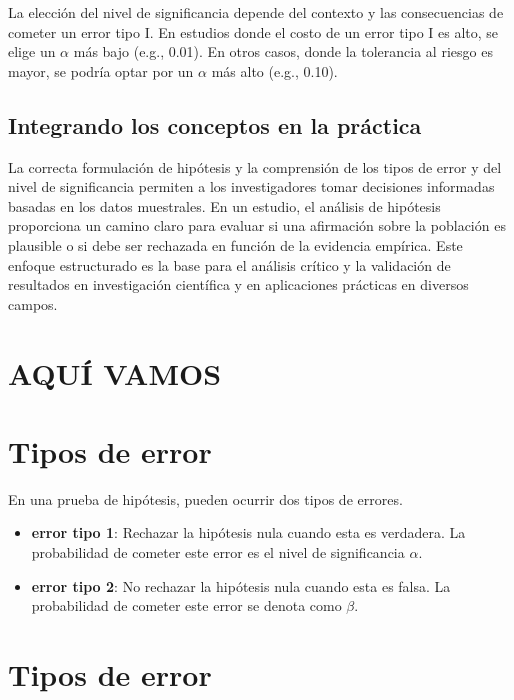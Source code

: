 \documentclass[
  letterpaper,
  DIV=11,
  numbers=noendperiod]{scrreprt}
\providecommand{\tightlist}{%
  \setlength{\itemsep}{0pt}\setlength{\parskip}{0pt}}\usepackage{longtable,booktabs,array}
\begin{document}
La elección del nivel de significancia depende del contexto y las
consecuencias de cometer un error tipo I. En estudios donde el costo de
un error tipo I es alto, se elige un \(\alpha\) más bajo (e.g., 0.01).
En otros casos, donde la tolerancia al riesgo es mayor, se podría optar
por un \(\alpha\) más alto (e.g., 0.10).

\subsection{Integrando los conceptos en la
práctica}\label{integrando-los-conceptos-en-la-pruxe1ctica}

La correcta formulación de hipótesis y la comprensión de los tipos de
error y del nivel de significancia permiten a los investigadores tomar
decisiones informadas basadas en los datos muestrales. En un estudio, el
análisis de hipótesis proporciona un camino claro para evaluar si una
afirmación sobre la población es plausible o si debe ser rechazada en
función de la evidencia empírica. Este enfoque estructurado es la base
para el análisis crítico y la validación de resultados en investigación
científica y en aplicaciones prácticas en diversos campos.

\section{AQUÍ VAMOS}\label{aquuxed-vamos}

\section{Tipos de error}\label{tipos-de-error-1}

En una prueba de hipótesis, pueden ocurrir dos tipos de errores.

\begin{itemize}
\tightlist
\item
  \textbf{error tipo 1}: Rechazar la hipótesis nula cuando esta es
  verdadera. La probabilidad de cometer este error es el nivel de
  significancia \(\alpha\).
\item
  \textbf{error tipo 2}: No rechazar la hipótesis nula cuando esta es
  falsa. La probabilidad de cometer este error se denota como \(\beta\).
\end{itemize}

\section{Tipos de error}\label{tipos-de-error-2}
\end{document}
